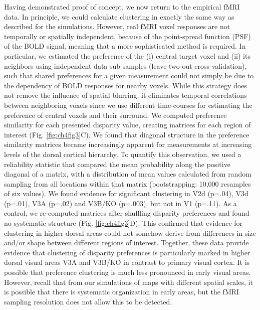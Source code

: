 Having demonstrated proof of concept, we now return to the empirical fMRI data. In principle, we could calculate clustering in exactly the same way as described for the simulations. However, real fMRI voxel responses are not temporally or spatially independent, because of the point-spread function (PSF) of the BOLD signal, meaning that a more sophisticated method is required. In particular, we estimated the preference of the (i) central target voxel and (ii) its neighbors using independent data sub-samples (leave-two-out cross-validation), such that shared preferences for a given measurement could not simply be due to the dependency of BOLD responses for nearby voxels. While this strategy does not remove the influence of spatial blurring, it eliminates temporal correlations between neighboring voxels since we use different time-courses for estimating the preference of central voxels and their surround. We computed preference similarity for each presented disparity value, creating matrices for each region of interest (Fig. \ref{fig:ch4fig3}C). We found that diagonal structure in the preference similarity matrices became increasingly apparent for measurements at increasing levels of the dorsal cortical hierarchy. To quantify this observation, we used a reliability statistic that compared the mean probability along the positive diagonal of a matrix, with a distribution of mean values calculated from random sampling from all locations within that matrix (bootstrapping: 10,000 resamples of six values). We found evidence for significant clustering in V2d (p=.04), V3d (p=.01), V3A (p=.02) and V3B/KO (p=.003), but not in V1 (p=.11). As a control, we re-computed matrices after shuffling disparity preferences and found no systematic structure (Fig. \ref{fig:ch4fig3}D). This confirmed that evidence for clustering in higher dorsal areas could not somehow derive from differences in size and/or shape between different regions of interest. Together, these data provide evidence that clustering of disparity preferences is particularly marked in higher dorsal visual areas V3A and V3B/KO in contrast to primary visual cortex. It is possible that preference clustering is much less pronounced in early visual areas. However, recall that from our simulations of maps with different spatial scales, it is possible that there is systematic organization in early areas, but the fMRI sampling resolution does not allow this to be detected.

